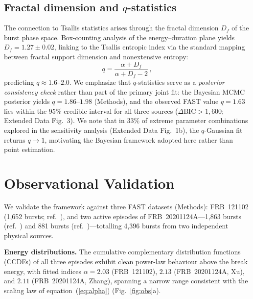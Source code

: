 \documentclass[twocolumn]{article}
\newcommand{\frb}[1]{FRB~#1}
\begin{document}
\subsection{Fractal dimension and $q$-statistics}

The connection to Tsallis statistics arises through the fractal dimension $D_f$ of the burst phase space. Box-counting analysis of the energy--duration plane yields $D_f = 1.27 \pm 0.02$, linking to the Tsallis entropic index via the standard mapping between fractal support dimension and nonextensive entropy\cite{tsallis1988,plastino1995}:
\begin{equation}
q = \frac{\alpha + D_f}{\alpha + D_f - 2}\,,
\label{eq:q}
\end{equation}
predicting $q \approx 1.6$--$2.0$. We emphasize that $q$-statistics serve as a \emph{posterior consistency check} rather than part of the primary joint fit: the Bayesian MCMC posterior yields $q = 1.86$--$1.98$ (Methods), and the observed FAST value $q = 1.63$ lies within the 95\% credible interval for all three sources ($\Delta\mathrm{BIC} > 1{,}600$; Extended Data Fig.~3). We note that in 33\% of extreme parameter combinations explored in the sensitivity analysis (Extended Data Fig.~1b), the $q$-Gaussian fit returns $q \to 1$, motivating the Bayesian framework adopted here rather than point estimation.


\section{Observational Validation}
\label{sec:obs}

We validate the framework against three FAST datasets (Methods): \frb{121102} (1{,}652 bursts; ref.~\cite{li2021}), and two active episodes of \frb{20201124A}---1{,}863 bursts (ref.~\cite{xu2022}) and 881 bursts (ref.~\cite{zhang2022})---totalling 4{,}396 bursts from two independent physical sources.

\textbf{Energy distributions.} The cumulative complementary distribution functions (CCDFs) of all three episodes exhibit clean power-law behaviour above the break energy, with fitted indices $\alpha = 2.03$ (\frb{121102}), $2.13$ (\frb{20201124A}, Xu), and $2.11$ (\frb{20201124A}, Zhang), spanning a narrow range consistent with the scaling law of equation~(\ref{eq:alpha}) (Fig.~\ref{fig:obs}a).
\end{document}
